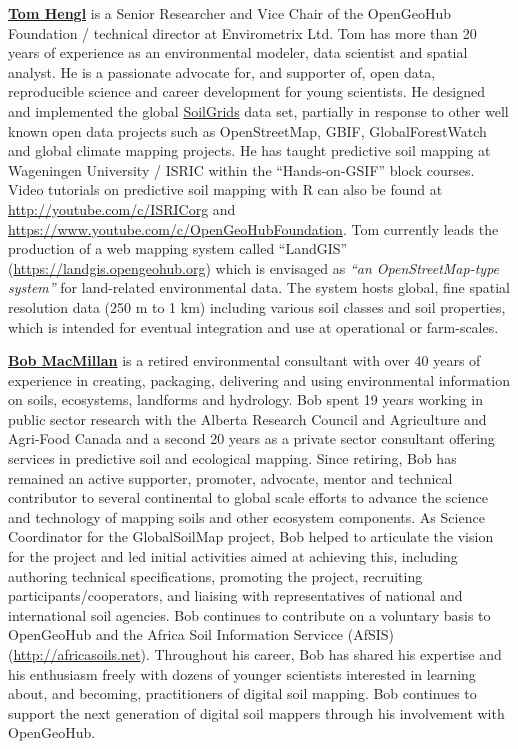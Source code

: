 \documentclass[graybox,natbib,nospthms]{svmono}
\begin{document}
\href{https://opengeohub.org/people/tom-hengl}{\textbf{Tom Hengl}} is a
Senior Researcher and Vice Chair of the OpenGeoHub Foundation /
technical director at Envirometrix Ltd. Tom has more than 20 years of
experience as an environmental modeler, data scientist and spatial
analyst. He is a passionate advocate for, and supporter of, open data,
reproducible science and career development for young scientists. He
designed and implemented the global
\href{http://journals.plos.org/plosone/article?id=10.1371/journal.pone.0169748}{SoilGrids}
data set, partially in response to other well known open data projects
such as OpenStreetMap, GBIF, GlobalForestWatch and global climate
mapping projects. He has taught predictive soil mapping at Wageningen
University / ISRIC within the ``Hands-on-GSIF'' block courses. Video
tutorials on predictive soil mapping with R can also be found at
\url{http://youtube.com/c/ISRICorg} and
\url{https://www.youtube.com/c/OpenGeoHubFoundation}. Tom currently
leads the production of a web mapping system called ``LandGIS''
(\url{https://landgis.opengeohub.org}) which is envisaged as \emph{``an
OpenStreetMap-type system''} for land-related environmental data. The
system hosts global, fine spatial resolution data (250 m to 1 km)
including various soil classes and soil properties, which is intended
for eventual integration and use at operational or farm-scales.

\href{https://opengeohub.org/people/bob-macmillan}{\textbf{Bob
MacMillan}} is a retired environmental consultant with over 40 years of
experience in creating, packaging, delivering and using environmental
information on soils, ecosystems, landforms and hydrology. Bob spent 19
years working in public sector research with the Alberta Research
Council and Agriculture and Agri-Food Canada and a second 20 years as a
private sector consultant offering services in predictive soil and
ecological mapping. Since retiring, Bob has remained an active
supporter, promoter, advocate, mentor and technical contributor to
several continental to global scale efforts to advance the science and
technology of mapping soils and other ecosystem components. As Science
Coordinator for the GlobalSoilMap project, Bob helped to articulate the
vision for the project and led initial activities aimed at achieving
this, including authoring technical specifications, promoting the
project, recruiting participants/cooperators, and liaising with
representatives of national and international soil agencies. Bob
continues to contribute on a voluntary basis to OpenGeoHub and the
Africa Soil Information Servicce (AfSIS) (\url{http://africasoils.net}).
Throughout his career, Bob has shared his expertise and his enthusiasm
freely with dozens of younger scientists interested in learning about,
and becoming, practitioners of digital soil mapping. Bob continues to
support the next generation of digital soil mappers through his
involvement with OpenGeoHub.
\end{document}
